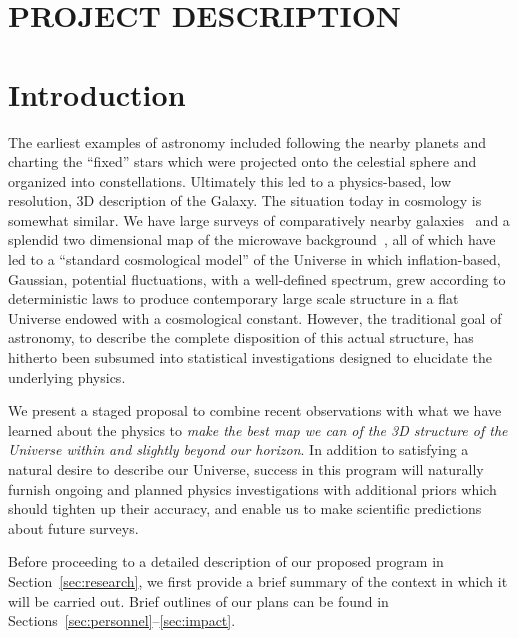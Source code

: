 \documentclass[psfig,12pt]{article}
\def\ni{\noindent}
\begin{document}
\section*{PROJECT DESCRIPTION}


\section{Introduction}
\label{sec:intro}

\ni{\bf Mapping Our Universe:}
The earliest examples of astronomy included following the nearby planets
and charting the ``fixed'' stars which were projected onto the celestial
sphere and organized into constellations. Ultimately this led to a
physics-based, low resolution,  3D description of the Galaxy. The
situation today in cosmology is somewhat similar. We have large surveys
of comparatively nearby galaxies~\cite{Kaiser2002, Ivezc2002, Davis2003,
Giavalisco2004, DES2005, Faber2007, Scoville2007,
Kaiser2010, Blake2011, Alam2015} and a splendid
two dimensional map of the microwave background~\cite{Planck2015maps},
all of which have led to a ``standard cosmological model'' of the
Universe in which
inflation-based, Gaussian, potential fluctuations, with a well-defined
spectrum, grew according to deterministic laws to produce contemporary
large scale structure in a flat Universe endowed with a cosmological
constant. However, the traditional goal of astronomy, to describe the
complete disposition of this actual structure, has hitherto been
subsumed into statistical investigations designed to elucidate the
underlying physics.

We present a staged proposal to combine recent observations with what we
have learned about the physics to {\it make the best map we can of the 3D
structure of the Universe within and slightly beyond our horizon}. In
addition to satisfying a natural desire to describe our Universe,
success in this program will naturally furnish ongoing and planned
physics investigations with additional priors which should tighten up
their accuracy, and enable us to make scientific predictions about
future surveys.

Before proceeding to a detailed description of our proposed program in
Section~\ref{sec:research}, we first provide a brief summary of the
context in which it will be carried out. Brief outlines of our plans
can be found in
Sections~\ref{sec:personnel}--\ref{sec:impact}.
\vspace{\baselineskip}
\end{document}
